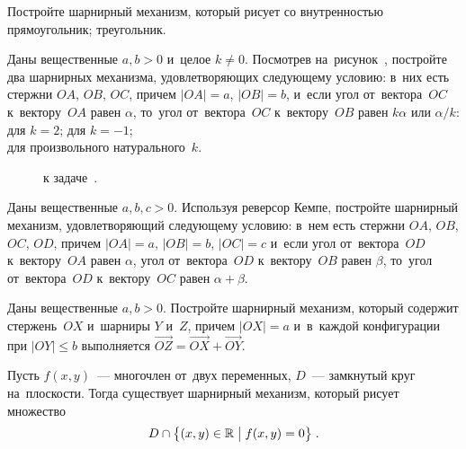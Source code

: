 \begin{problems}

\item
Постройте шарнирный механизм, который рисует со внутренностью
\\
\subproblem прямоугольник;
\quad
\subproblem треугольник.

\item{}
%
Даны вещественные $a, b > 0$ и~целое $k \neq 0$.
Посмотрев на~рисунок~,
постройте два шарнирных механизма, удовлетворяющих
следующему условию: в~них есть стержни $OA$, $OB$, $OC$, причем $|OA| = a$,
$|OB| = b$, и~если угол от~вектора~$OC$ к~вектору~$OA$ равен $\alpha$, то~угол
от~вектора~$OC$ к~вектору~$OB$ равен $k \alpha$ или $\alpha / k$:
\\
\subproblem для $k = 2$;
\quad
\subproblem для $k = -1$;
\\
\subproblem для произвольного натурального~$k$.

\begin{figure}[ht]
\begin{center}
    \caption{к задаче~.}
\end{center}
\end{figure}

\item{}
Даны вещественные $a, b, c > 0$.
Используя реверсор Кемпе, постройте шарнирный механизм, удовлетворяющий
следующему условию: в~нем есть стержни $OA$, $OB$, $OC$, $OD$, причем
$|OA| = a$, $|OB| = b$, $|OC| = c$ и~если угол от~вектора~$OD$ к~вектору~$OA$
равен $\alpha$, угол от~вектора~$OD$ к~вектору~$OB$ равен $\beta$, то~угол
от~вектора~$OD$ к~вектору~$OC$ равен $\alpha + \beta$.

\let\ov\overrightarrow

\item{}
Даны вещественные $a, b > 0$.
Постройте шарнирный механизм, который содержит стержень~$OX$ и~шарниры
$Y$ и~$Z$, причем $|OX| = a$ и~в~каждой конфигурации при $|OY| \leq b$
выполняется $\ov{OZ} = \ov{OX} + \ov{OY}$.

\end{problems}

Пусть $f(x, y)$~--- многочлен от~двух переменных, $D$~--- замкнутый круг
на~плоскости.
Тогда существует шарнирный механизм, который рисует множество
\[
    D \cap
    \bigl\{
        (x,y) \in \mathbb{R}
    \bigm|
        f(x, y) = 0
    \bigr\}
\; . \]

